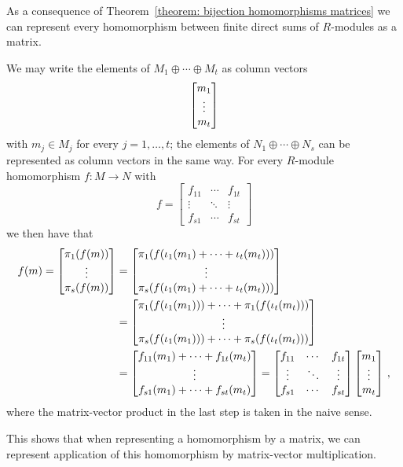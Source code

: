 \begin{fluff}
  As a consequence of Theorem~\ref{theorem: bijection homomorphisms matrices} we can represent every homomorphism between finite direct sums of $R$-modules as a matrix.
\end{fluff}

\begin{fluff}
  We may write the elements of $M_1 \oplus \dotsb \oplus M_t$ as column vectors
  \[
    \begin{bmatrix}m_1 \\ \vdots \\ m_t\end{bmatrix}
  \]
  with $m_j \in M_j$ for every $j = 1, \dotsc, t$;
  the elements of $N_1 \oplus \dotsb \oplus N_s$ can be represented as column vectors in the same way.
  For every $R$-module homomorphism $f \colon M \to N$ with
  \[
      f
    = \begin{bmatrix}
        f_{11}  & \cdots  & f_{1t}  \\
        \vdots  & \ddots  & \vdots  \\
        f_{s1}  & \cdots  & f_{st}
      \end{bmatrix}
  \]
  we then have that
  \begin{align*}
        f(m)
     =  \begin{bmatrix} \pi_1(f(m)) \\ \vdots \\ \pi_s(f(m)) \end{bmatrix}
    &=  \begin{bmatrix}
          \pi_1( f( \iota_1(m_1) + \dotsb + \iota_t(m_t) ) )
          \\
          \vdots
          \\
          \pi_s( f( \iota_1(m_1) + \dotsb + \iota_t(m_t) ) )
        \end{bmatrix}
    \\
    &=  \begin{bmatrix}
          \pi_1(f(\iota_1(m_1))) + \dotsb + \pi_1(f(\iota_t(m_t)))
          \\
          \vdots
          \\
          \pi_s(f(\iota_1(m_1))) + \dotsb + \pi_s(f(\iota_t(m_t)))
        \end{bmatrix}
    \\
    &=  \begin{bmatrix}
          f_{11}(m_1) + \dotsb + f_{1t}(m_t)
          \\
          \vdots
          \\
          f_{s1}(m_1) + \dotsb + f_{st}(m_t)
        \end{bmatrix}
    = \begin{bmatrix}
        f_{11}  & \cdots  & f_{1t}  \\
        \vdots  & \ddots  & \vdots  \\
        f_{s1}  & \cdots  & f_{st}
      \end{bmatrix}
      \begin{bmatrix}m_1 \\ \vdots \\ m_t\end{bmatrix} \,,
  \end{align*}
  where the matrix-vector product in the last step is taken in the naive sense.
  
  This shows that when representing a homomorphism by a matrix, we can represent application of this homomorphism by matrix-vector multiplication.
\end{fluff}


